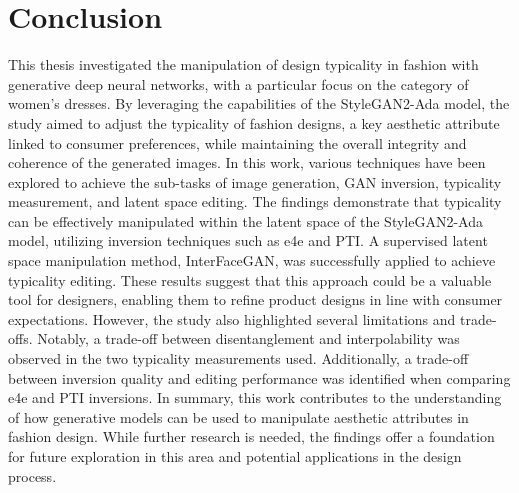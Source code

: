\section{Conclusion}
This thesis investigated the manipulation of design typicality in fashion with generative deep neural networks, with a particular focus on the category of women's dresses. By leveraging the capabilities of the StyleGAN2-Ada model, the study aimed to adjust the typicality of fashion designs, a key aesthetic attribute linked to consumer preferences, while maintaining the overall integrity and coherence of the generated images. In this work, various techniques have been explored to achieve the sub-tasks of image generation, GAN inversion, typicality measurement, and latent space editing. The findings demonstrate that typicality can be effectively manipulated within the latent space of the StyleGAN2-Ada model, utilizing inversion techniques such as e4e and PTI. A supervised latent space manipulation method, InterFaceGAN, was successfully applied to achieve typicality editing. These results suggest that this approach could be a valuable tool for designers, enabling them to refine product designs in line with consumer expectations.
However, the study also highlighted several limitations and trade-offs. Notably, a trade-off between disentanglement and interpolability was observed in the two typicality measurements used. Additionally, a trade-off between inversion quality and editing performance was identified when comparing e4e and PTI inversions. In summary, this work contributes to the understanding of how generative models can be used to manipulate aesthetic attributes in fashion design. While further research is needed, the findings offer a foundation for future exploration in this area and potential applications in the design process.